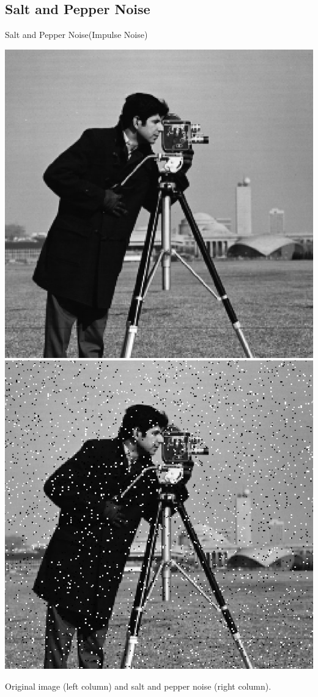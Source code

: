 \documentclass{beamer}
\begin{document}
\subsection{Salt and Pepper Noise}
\begin{frame}{Salt and Pepper Noise(Impulse Noise)}

\vspace{1cm}
\begin{center}

    \includegraphics[width=0.4\columnwidth]{images/salt_pepper_origin.jpg}
    \includegraphics[width=0.4\columnwidth]{images/salt_pepper_noise.jpg}
	
	Original image (left column) and salt and pepper noise (right column).



\end{center}

\end{frame}
\end{document}
